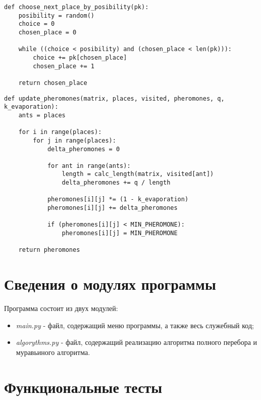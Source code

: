 \clearpage

\begin{center}
    \captionsetup{justification=raggedright,singlelinecheck=off}
    \begin{lstlisting}[label=lst:choose_next,caption=Алгоритм нахождения следующего города на основании рандома]
def choose_next_place_by_posibility(pk):
	posibility = random()
	choice = 0
	chosen_place = 0

	while ((choice < posibility) and (chosen_place < len(pk))):
		choice += pk[chosen_place]
		chosen_place += 1

	return chosen_place
\end{lstlisting}
\end{center}


\begin{center}
    \captionsetup{justification=raggedright,singlelinecheck=off}
    \begin{lstlisting}[label=lst:upd_pher,caption=Алгоритм обновления матрицы феромонов]
def update_pheromones(matrix, places, visited, pheromones, q, k_evaporation):
	ants = places

	for i in range(places):
		for j in range(places):
			delta_pheromones = 0

			for ant in range(ants):
				length = calc_length(matrix, visited[ant])
				delta_pheromones += q / length

			pheromones[i][j] *= (1 - k_evaporation)
			pheromones[i][j] += delta_pheromones

			if (pheromones[i][j] < MIN_PHEROMONE):
				pheromones[i][j] = MIN_PHEROMONE

	return pheromones
\end{lstlisting}
\end{center}

\section{Сведения о модулях программы}
Программа состоит из двух модулей:
\begin{itemize}
	\item \textit{main.py} - файл, содержащий меню программы, а также весь служебный код;
    \item \textit{algorythms.py} - файл, содержащий реализацию алгоритма полного перебора и муравьиного алгоритма.
\end{itemize}


\section{Функциональные тесты}

